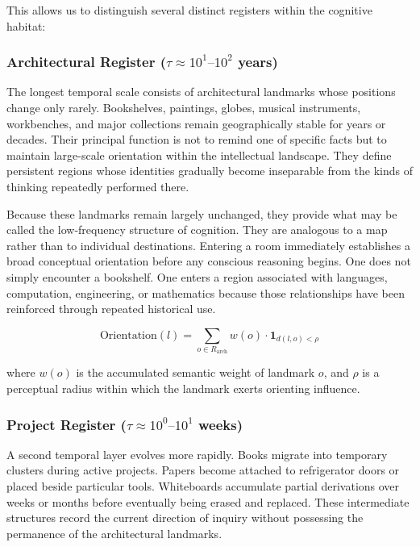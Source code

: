 \documentclass[12pt,oneside]{article}
\theoremstyle{remark}
\begin{document}
This allows us to distinguish several distinct registers within the cognitive habitat:

\subsubsection{Architectural Register ($\tau \approx 10^1\text{--}10^2$ years)}

The longest temporal scale consists of architectural landmarks whose positions change only rarely. Bookshelves, paintings, globes, musical instruments, workbenches, and major collections remain geographically stable for years or decades. Their principal function is not to remind one of specific facts but to maintain large-scale orientation within the intellectual landscape. They define persistent regions whose identities gradually become inseparable from the kinds of thinking repeatedly performed there.

Because these landmarks remain largely unchanged, they provide what may be called the low-frequency structure of cognition. They are analogous to a map rather than to individual destinations. Entering a room immediately establishes a broad conceptual orientation before any conscious reasoning begins. One does not simply encounter a bookshelf. One enters a region associated with languages, computation, engineering, or mathematics because those relationships have been reinforced through repeated historical use.

\begin{equation}
\text{Orientation}(l) = \sum_{o \in R_{\text{arch}}} w(o) \cdot \mathbf{1}_{d(l,o) < \rho}
\end{equation}

where $w(o)$ is the accumulated semantic weight of landmark $o$, and $\rho$ is a perceptual radius within which the landmark exerts orienting influence.

\subsubsection{Project Register ($\tau \approx 10^0\text{--}10^1$ weeks)}

A second temporal layer evolves more rapidly. Books migrate into temporary clusters during active projects. Papers become attached to refrigerator doors or placed beside particular tools. Whiteboards accumulate partial derivations over weeks or months before eventually being erased and replaced. These intermediate structures record the current direction of inquiry without possessing the permanence of the architectural landmarks.
\end{document}
